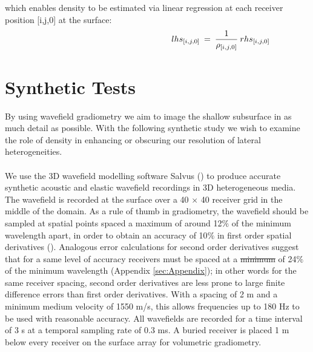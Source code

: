 \documentclass{article} %
\providecommand{\DIFaddtex}[1]{{\protect\color{blue}\uwave{#1}}} %
\providecommand{\DIFdeltex}[1]{{\protect\color{red}\sout{#1}}}                      %
\providecommand{\DIFaddbegin}{} %
\providecommand{\DIFaddend}{} %
\providecommand{\DIFdelbegin}{} %
\providecommand{\DIFdelend}{} %
\providecommand{\DIFadd}[1]{\texorpdfstring{\DIFaddtex{#1}}{#1}} %
\providecommand{\DIFdel}[1]{\texorpdfstring{\DIFdeltex{#1}}{}} %
\newcommand{\DIFscaledelfig}{0.5}
\newlength{\DIFdelgraphicswidth} %
\newlength{\DIFdelgraphicsheight} %
\newcommand{\DIFaddincludegraphics}[2][]{{\color{blue}\fbox{\DIFOincludegraphics[#1]{#2}}}} %
\newcommand{\DIFdelincludegraphics}[2][]{%
\sbox{\DIFdelgraphicsbox}{\DIFOincludegraphics[#1]{#2}}%
\settoboxwidth{\DIFdelgraphicswidth}{\DIFdelgraphicsbox} %
\settoboxtotalheight{\DIFdelgraphicsheight}{\DIFdelgraphicsbox} %
\scalebox{\DIFscaledelfig}{%
\parbox[b]{\DIFdelgraphicswidth}{\usebox{\DIFdelgraphicsbox}\\[-\baselineskip] \rule{\DIFdelgraphicswidth}{0em}}\llap{\resizebox{\DIFdelgraphicswidth}{\DIFdelgraphicsheight}{%
\setlength{\unitlength}{\DIFdelgraphicswidth}%
\begin{picture}(1,1)%
\thicklines\linethickness{2pt} %
{\color[rgb]{1,0,0}\put(0,0){\framebox(1,1){}}}%
{\color[rgb]{1,0,0}\put(0,0){\line( 1,1){1}}}%
{\color[rgb]{1,0,0}\put(0,1){\line(1,-1){1}}}%
\end{picture}%
}\hspace*{3pt}}} %
} %
\DeclareRobustCommand{\DIFaddbegin}{\DIFOaddbegin \let\includegraphics\DIFaddincludegraphics} %
\DeclareRobustCommand{\DIFaddend}{\DIFOaddend \let\includegraphics\DIFOincludegraphics} %
\DeclareRobustCommand{\DIFdelbegin}{\DIFOdelbegin \let\includegraphics\DIFdelincludegraphics} %
\DeclareRobustCommand{\DIFdelend}{\DIFOaddend \let\includegraphics\DIFOincludegraphics} %
\begin{document}
	which enables density to be estimated via linear regression at each receiver position [i,j,0] at the surface:
	\begin{align} \shoveright \shoveright \shoveright \shoveright \shoveright \shoveright \shoveright \shoveright \shoveright \shoveright \shoveright \shoveright \shoveright \shoveright 
		\shoveright \shoveright 
		lhs_{[i,j,0]} \:&=\: \frac{1}{\rho_{[i,j,0]}}   \: rhs_{[i,j,0]}
		\label{eq:FS_RHO_linREG}   
	\end{align}


	\section{Synthetic Tests} \label{sec:synstudie}
	By using wavefield gradiometry we aim to image the shallow subsurface in as much detail as possible. With the following synthetic study we wish to examine the role of density in enhancing or obscuring our resolution of lateral heterogeneities.\\ \\
	We use the 3D wavefield modelling software Salvus (\cite{afanasiev2019modular}) to produce accurate synthetic acoustic and elastic wavefield recordings in 3D heterogeneous media. The wavefield is recorded at the surface over a 40 $\times$ 40 receiver grid in the middle of the domain. As a rule of thumb in gradiometry, the wavefield should be sampled at spatial points spaced a maximum of around 12$\%$ of the minimum wavelength apart, in order to obtain an accuracy of 10$\%$ in first order spatial derivatives (\cite{Langston1}). Analogous error calculations for second order derivatives suggest that for a same level of accuracy receivers must be spaced at a \DIFdelbegin \DIFdel{minimum }\DIFdelend \DIFaddbegin \DIFadd{maximum }\DIFaddend of 24$\%$ of the minimum wavelength (Appendix \ref{sec:Appendix}); in other words for the same receiver spacing, second order derivatives are less prone to large finite difference errors than first order derivatives. With a spacing of 2 m and a minimum medium velocity of 1550 m/s, this allows frequencies up to 180 Hz to be used with reasonable accuracy. All wavefields are recorded for a time interval of 3 s at a temporal sampling rate of 0.3 ms. A buried receiver is placed 1 m below every receiver on the surface array for volumetric gradiometry.
\end{document}

